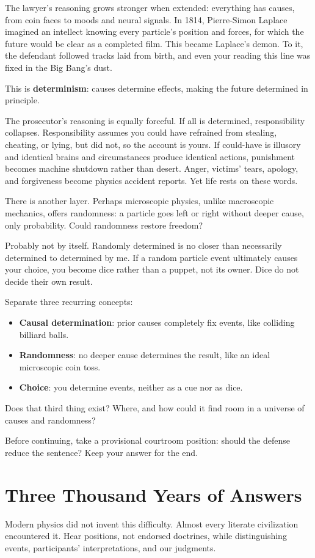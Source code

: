 The lawyer's reasoning grows stronger when extended: everything has causes, from coin faces to moods and neural signals. In 1814, Pierre-Simon Laplace imagined an intellect knowing every particle's position and forces, for which the future would be clear as a completed film. This became Laplace's demon. To it, the defendant followed tracks laid from birth, and even your reading this line was fixed in the Big Bang's dust.

This is \textbf{determinism}: causes determine effects, making the future determined in principle.

The prosecutor's reasoning is equally forceful. If all is determined, responsibility collapses. Responsibility assumes you could have refrained from stealing, cheating, or lying, but did not, so the account is yours. If could-have is illusory and identical brains and circumstances produce identical actions, punishment becomes machine shutdown rather than desert. Anger, victims' tears, apology, and forgiveness become physics accident reports. Yet life rests on these words.

There is another layer. Perhaps microscopic physics, unlike macroscopic mechanics, offers randomness: a particle goes left or right without deeper cause, only probability. Could randomness restore freedom?

Probably not by itself. Randomly determined is no closer than necessarily determined to determined by me. If a random particle event ultimately causes your choice, you become dice rather than a puppet, not its owner. Dice do not decide their own result.

Separate three recurring concepts:

\begin{itemize}
\item \textbf{Causal determination}: prior causes completely fix events, like colliding billiard balls.
\item \textbf{Randomness}: no deeper cause determines the result, like an ideal microscopic coin toss.
\item \textbf{Choice}: you determine events, neither as a cue nor as dice.
\end{itemize}
Does that third thing exist? Where, and how could it find room in a universe of causes and randomness?

Before continuing, take a provisional courtroom position: should the defense reduce the sentence? Keep your answer for the end.

\section{Three Thousand Years of Answers}
Modern physics did not invent this difficulty. Almost every literate civilization encountered it. Hear positions, not endorsed doctrines, while distinguishing events, participants' interpretations, and our judgments.

